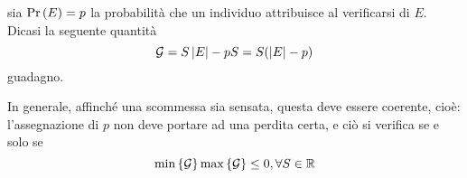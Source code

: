 \documentclass{subfiles}
\begin{document}
\begin{Definition*}
    sia \(\Prob{E} = p\) la probabilità che un individuo attribuisce al verificarsi di \(E\).
    Dicasi la seguente quantità
    \[
        \mathcal{G} = S \left\vert {E} \right\vert - pS = S(\left\vert {E} \right\vert - p)
    \]
    guadagno.
\end{Definition*}
In generale, affinché una scommessa sia sensata, questa deve essere coerente, cioè:
l'assegnazione di \(p\) non deve portare ad una perdita certa, e ciò si verifica se e solo se
\[
    \Min*{\mathcal{G}} \Max*{\mathcal{G}} \le 0, \forall S \in \Real
\]
\end{document}

